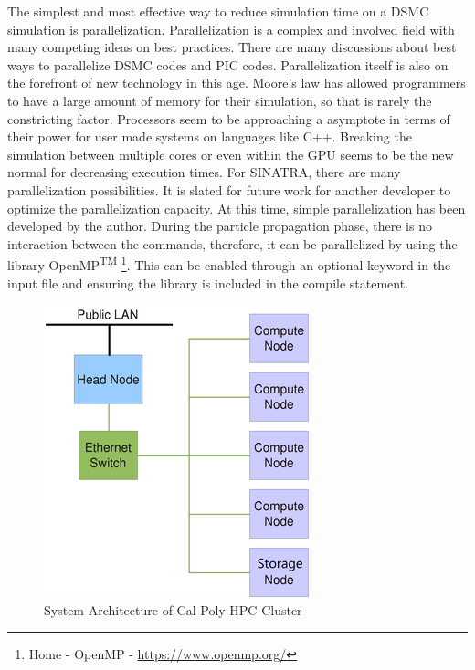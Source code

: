 \indent The simplest and most effective way to reduce simulation time on a DSMC simulation is parallelization. Parallelization is a complex and involved field with many competing ideas on best practices. There are many discussions about best ways to parallelize DSMC codes and PIC codes. Parallelization itself is also on the forefront of new technology in this age. Moore's law has allowed programmers to have a large amount of memory for their simulation, so that is rarely the constricting factor. Processors seem to be approaching a asymptote in terms of their power for user made systems on languages like C++. Breaking the simulation between multiple cores or even within the GPU seems to be the new normal for decreasing execution times. For SINATRA, there are many parallelization possibilities. It is slated for future work for another developer to optimize the parallelization capacity. At this time, simple parallelization has been developed by the author. During the particle propagation phase, there is no interaction between the commands, therefore, it can be parallelized by using the library OpenMP\textsuperscript{TM} \footnote{Home - OpenMP - \url{https://www.openmp.org/}}. This can be enabled through an optional keyword in the input file and ensuring the library is included in the compile statement. \par


\begin{figure}
\includegraphics[width=.55\textwidth]{figures/HPC_cluster.png}
\centering
\caption[System Architecture of Cal Poly HPC Cluster]{System Architecture of Cal Poly HPC Cluster \cite{hpc}}
\label{fig:hpccluser}
\end{figure}


